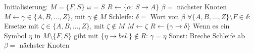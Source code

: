 \begin{algorithm}[caption={Inferieren eines L-Systems aus einer Baumstruktur}, label={alg2}]
    Initialisierung:
        $M=\{F,S\}$
        $\omega=S$
        $R \gets \{\alpha$: $S \rightarrow A\}$
        $\beta=$ nächster Knoten
        $M \gets \gamma \in \{A,B,\dots,Z\}$, mit $\gamma \notin M$
    Schleife:
        $\delta=$ Wort von $\beta$
        $\forall \{A,B,\dots,Z\} \setminus F \in \delta:$
        Ersetze mit $\zeta \in \{A,B,\dots,Z\}$, mit $\zeta \notin M$
        $M \gets \zeta$
        $R \gets \{\gamma\rightarrow\delta\}$
        Wenn es ein Symbol $\eta$ in $M\setminus\{F,S\}$ gibt mit $\{\eta \rightarrow bel.\} \notin R$:
            $\gamma=\eta$
        Sonst:
            Breche Schleife ab
        $\beta=$ nächster Knoten
\end{algorithm}

